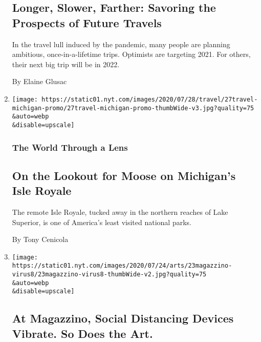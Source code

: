 \begin{enumerate}
{  \subsection{Longer, Slower, Farther: Savoring the Prospects of Future
  Travels}\label{longer-slower-farther-savoring-the-prospects-of-future-travels}}

  In the travel lull induced by the pandemic, many people are planning
  ambitious, once-in-a-lifetime trips. Optimists are targeting 2021. For
  others, their next big trip will be in 2022.

  By Elaine Glusac
\item
  \href{/2020/07/27/travel/moose-michigan-isle-royale.html}{}

  \texttt{[image: https://static01.nyt.com/images/2020/07/28/travel/27travel-michigan-promo/27travel-michigan-promo-thumbWide-v3.jpg?quality=75\\\&auto=webp\\\&disable=upscale]}

  \hypertarget{the-world-through-a-lens}{%
  \subsubsection{The World Through a
  Lens}\label{the-world-through-a-lens}}

  \hypertarget{on-the-lookout-for-moose-on-michigans-isle-royale}{%
  \subsection{On the Lookout for Moose on Michigan's Isle
  Royale}\label{on-the-lookout-for-moose-on-michigans-isle-royale}}

  The remote Isle Royale, tucked away in the northern reaches of Lake
  Superior, is one of America's least visited national parks.

  By Tony Cenicola
\item
  \href{/2020/07/22/arts/design/magazzino-art-social-distancing-virus.html}{}

  \texttt{[image: https://static01.nyt.com/images/2020/07/24/arts/23magazzino-virus8/23magazzino-virus8-thumbWide-v2.jpg?quality=75\\\&auto=webp\\\&disable=upscale]}

  \hypertarget{at-magazzino-social-distancing-devices-vibrate-so-does-the-art}{%
  \subsection{At Magazzino, Social Distancing Devices Vibrate. So Does
  the
  Art.}\label{at-magazzino-social-distancing-devices-vibrate-so-does-the-art}}


\end{enumerate}
